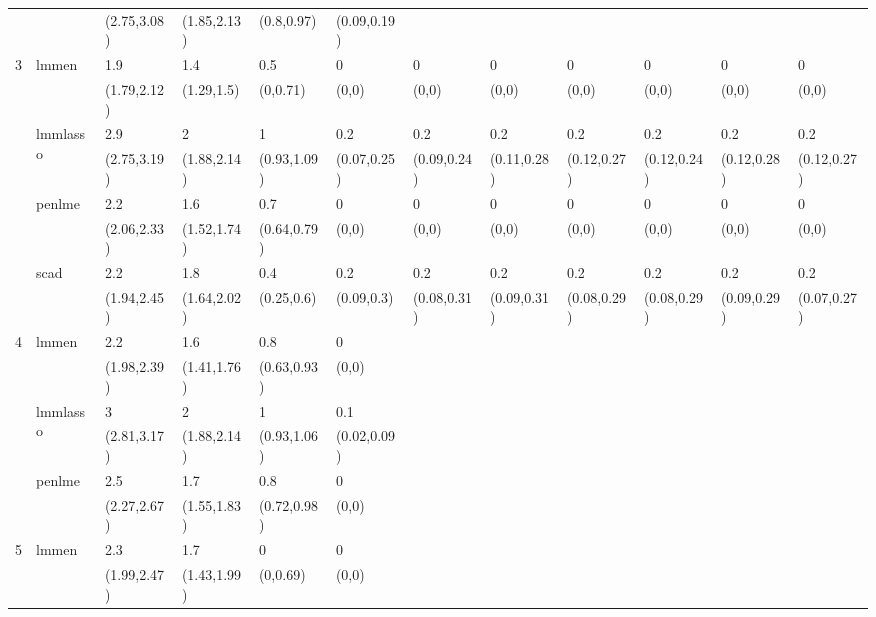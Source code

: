 \begin{table}[ht]
\begin{tabular}{llllllllllll}
   &  & (2.75,3.08) & (1.85,2.13) & (0.8,0.97) & (0.09,0.19) &  &  &  &  &  &  \\ 
  \multirow{8}{*}{3} & \multirow{2}{*}{lmmen} & 1.9 & 1.4 & 0.5 & 0 & 0 & 0 & 0 & 0 & 0 & 0 \\ 
   &  & (1.79,2.12) & (1.29,1.5) & (0,0.71) & (0,0) & (0,0) & (0,0) & (0,0) & (0,0) & (0,0) & (0,0) \\ 
   & \multirow{2}{*}{lmmlasso} & 2.9 & 2 & 1 & 0.2 & 0.2 & 0.2 & 0.2 & 0.2 & 0.2 & 0.2 \\ 
   &  & (2.75,3.19) & (1.88,2.14) & (0.93,1.09) & (0.07,0.25) & (0.09,0.24) & (0.11,0.28) & (0.12,0.27) & (0.12,0.24) & (0.12,0.28) & (0.12,0.27) \\ 
   & \multirow{2}{*}{penlme} & 2.2 & 1.6 & 0.7 & 0 & 0 & 0 & 0 & 0 & 0 & 0 \\ 
   &  & (2.06,2.33) & (1.52,1.74) & (0.64,0.79) & (0,0) & (0,0) & (0,0) & (0,0) & (0,0) & (0,0) & (0,0) \\ 
   & \multirow{2}{*}{scad} & 2.2 & 1.8 & 0.4 & 0.2 & 0.2 & 0.2 & 0.2 & 0.2 & 0.2 & 0.2 \\ 
   &  & (1.94,2.45) & (1.64,2.02) & (0.25,0.6) & (0.09,0.3) & (0.08,0.31) & (0.09,0.31) & (0.08,0.29) & (0.08,0.29) & (0.09,0.29) & (0.07,0.27) \\ 
  \multirow{6}{*}{4} & \multirow{2}{*}{lmmen} & 2.2 & 1.6 & 0.8 & 0 &  &  &  &  &  &  \\ 
   &  & (1.98,2.39) & (1.41,1.76) & (0.63,0.93) & (0,0) &  &  &  &  &  &  \\ 
   & \multirow{2}{*}{lmmlasso} & 3 & 2 & 1 & 0.1 &  &  &  &  &  &  \\ 
   &  & (2.81,3.17) & (1.88,2.14) & (0.93,1.06) & (0.02,0.09) &  &  &  &  &  &  \\ 
   & \multirow{2}{*}{penlme} & 2.5 & 1.7 & 0.8 & 0 &  &  &  &  &  &  \\ 
   &  & (2.27,2.67) & (1.55,1.83) & (0.72,0.98) & (0,0) &  &  &  &  &  &  \\ 
  \multirow{2}{*}{5} & \multirow{2}{*}{lmmen} & 2.3 & 1.7 & 0 & 0 &  &  &  &  &  &  \\ 
   &  & (1.99,2.47) & (1.43,1.99) & (0,0.69) & (0,0) &  &  &  &  &  &  \\ 
   \hline
\end{tabular}
\end{table}

